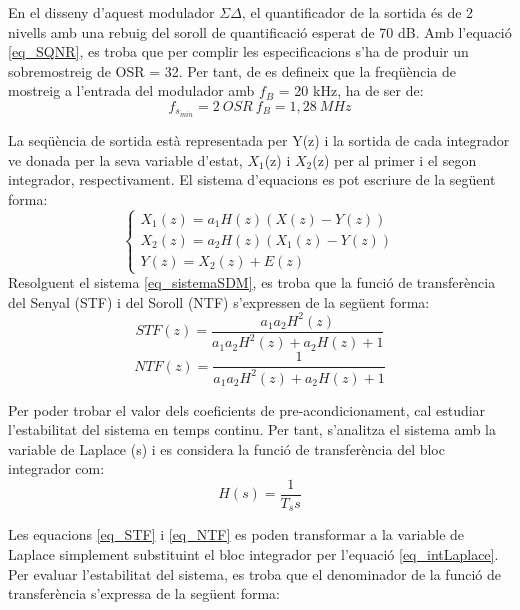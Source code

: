 \par En el disseny d'aquest modulador $\Sigma \Delta$, el quantificador de la sortida és de 2 nivells amb una rebuig del soroll de quantificació esperat de 70 dB. Amb l'equació \ref{eq_SQNR}, es troba que per complir les especificacions s'ha de produir un sobremostreig de OSR = 32. Per tant, de \cite{UndrstndSDM} es defineix que la freqüència de mostreig a l'entrada del modulador amb $f_B$ = 20 kHz, ha de ser de:
\begin{equation}
    f_{s_{min}} = 2\ OSR\ f_B = 1,28\ MHz
\end{equation}
\par La seqüència de sortida està representada per Y(z) i la sortida de cada integrador ve donada per la seva variable d'estat, $X_1$(z) i $X_2$(z) per al primer i el segon integrador, respectivament. El sistema d'equacions es pot escriure de la següent forma:
\begin{equation}\label{eq_sistemaSDM}
    \left\lbrace\begin{array}{c}  X_1(z) = a_1 H(z) (X(z)-Y(z)) \\ X_2(z) = a_2 H(z) (X_1(z)-Y(z)) \\
    Y(z) = X_2(z) + E(z)\end{array}\right.
\end{equation}
Resolguent el sistema \ref{eq_sistemaSDM}, es troba que la funció de transferència del Senyal (STF) i del Soroll (NTF) s'expressen de la següent forma:
\begin{equation}\label{eq_STF}
    STF(z) = \frac{a_1 a_2 H^{2}(z)}{a_1 a_2 H^{2}(z) + a_2 H(z) + 1}
\end{equation}
\begin{equation}\label{eq_NTF}
    NTF(z) = \frac{1}{a_1 a_2 H^{2}(z) + a_2 H(z) + 1}
\end{equation}
\par Per poder trobar el valor dels coeficients de pre-acondicionament, cal estudiar l'estabilitat del sistema en temps continu. Per tant, s'analitza el sistema amb la variable de Laplace (s) i es considera la funció de transferència del bloc integrador com:
\begin{equation}\label{eq_intLaplace}
  H(s) = \frac{1}{T_s s}  
\end{equation} 
\par Les equacions \ref{eq_STF} i \ref{eq_NTF} es poden transformar a la variable de Laplace simplement substituint el bloc integrador per l'equació \ref{eq_intLaplace}. Per evaluar l'estabilitat del sistema, es troba que el denominador de la funció de transferència s'expressa de la següent forma:
